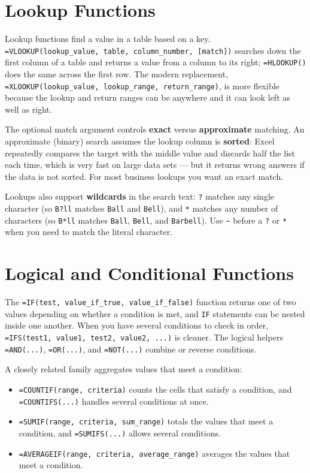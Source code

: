 \documentclass[
  11pt,
  letterpaper,
  DIV=11,
  numbers=noendperiod,
  oneside,
  open=any]{scrreprt}
\providecommand{\tightlist}{%
  \setlength{\itemsep}{0pt}\setlength{\parskip}{0pt}}\usepackage{longtable,booktabs,array}
\begin{document}
\section{Lookup Functions}\label{lookup-functions}

Lookup functions find a value in a table based on a key.
\texttt{=VLOOKUP(lookup\_value,\ table,\ column\_number,\ {[}match{]})}
searches down the first column of a table and returns a value from a
column to its right; \texttt{=HLOOKUP()} does the same across the first
row. The modern replacement,
\texttt{=XLOOKUP(lookup\_value,\ lookup\_range,\ return\_range)}, is
more flexible because the lookup and return ranges can be anywhere and
it can look left as well as right.

The optional match argument controls \textbf{exact} versus
\textbf{approximate} matching. An approximate (binary) search assumes
the lookup column is \textbf{sorted}: Excel repeatedly compares the
target with the middle value and discards half the list each time, which
is very fast on large data sets --- but it returns wrong answers if the
data is not sorted. For most business lookups you want an exact match.

Lookups also support \textbf{wildcards} in the search text: \texttt{?}
matches any single character (so \texttt{B?ll} matches \texttt{Ball} and
\texttt{Bell}), and \texttt{*} matches any number of characters (so
\texttt{B*ll} matches \texttt{Ball}, \texttt{Bell}, and
\texttt{Barbell}). Use \texttt{\textasciitilde{}} before a \texttt{?} or
\texttt{*} when you need to match the literal character.

\section{Logical and Conditional
Functions}\label{logical-and-conditional-functions}

The \texttt{=IF(test,\ value\_if\_true,\ value\_if\_false)} function
returns one of two values depending on whether a condition is met, and
\texttt{IF} statements can be nested inside one another. When you have
several conditions to check in order,
\texttt{=IFS(test1,\ value1,\ test2,\ value2,\ ...)} is cleaner. The
logical helpers \texttt{=AND(...)}, \texttt{=OR(...)}, and
\texttt{=NOT(...)} combine or reverse conditions.

A closely related family aggregates values that meet a condition:

\begin{itemize}
\tightlist
\item
  \texttt{=COUNTIF(range,\ criteria)} counts the cells that satisfy a
  condition, and \texttt{=COUNTIFS(...)} handles several conditions at
  once.
\item
  \texttt{=SUMIF(range,\ criteria,\ sum\_range)} totals the values that
  meet a condition, and \texttt{=SUMIFS(...)} allows several conditions.
\item
  \texttt{=AVERAGEIF(range,\ criteria,\ average\_range)} averages the
  values that meet a condition.
\end{itemize}
\end{document}
